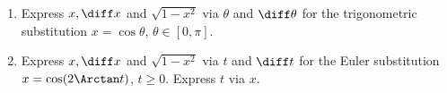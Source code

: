 \begin{enumerate}[ref={\fcProblemRef}]
\item \label{problemTheoreticalTrigSubx=cost} Express $x, \diff x $ and $\sqrt{1-x^2 }$ via $\theta$ and $\diff \theta$ for the trigonometric substitution $x=\cos \theta $, $\theta\in \left[0, \pi\right]$.
\item \label{problemTheoreticalTrigSubx=cos(2arctant)} Express $x, \diff x $ and $\sqrt{1-x^2}$ via $t$ and $\diff t$ for the Euler substitution $x=\cos(2\Arctan t)$, $t\geq 0$. Express $t$ via $x$.
\end{enumerate}


